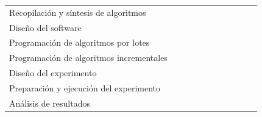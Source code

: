 \documentclass[oneside,openright,titlepage,numbers=noenddot,openany,headinclude,footinclude=true,
cleardoublepage=empty,abstractoff,BCOR=5mm,paper=a4,fontsize=12pt,main=spanish]{scrreprt}
\begin{document}
\begin{table}[H]
{\begin{tabular}{l|c|cccccclll}
Recopilación y síntesis de algoritmos             &                          &                          &                          & \cellcolor[HTML]{34FF34} &                          &                          &                          &                                              &                                              &                                              \\
Diseño del software                               &                          &                          &                          &                          & \cellcolor[HTML]{34FF34} &                          &                          &                                              &                                              &                                              \\
Programación de algoritmos por lotes              &                          &                          &                          &                          & \cellcolor[HTML]{34FF34} & \cellcolor[HTML]{34FF34} & \cellcolor[HTML]{34FF34} &                                              &                                              &                                              \\
Programación de algoritmos incrementales          &                          &                          &                          &                          &                          &                          & \cellcolor[HTML]{34FF34} & \multicolumn{1}{c}{\cellcolor[HTML]{34FF34}} &                                              &                                              \\
Diseño del experimento                            &                          &                          &                          &                          &                          &                          &                          & \multicolumn{1}{c}{\cellcolor[HTML]{34FF34}} & \multicolumn{1}{c}{}                         &                                              \\
Preparación y ejecución del experimento           & \multicolumn{1}{l|}{}    & \multicolumn{1}{l}{}     & \multicolumn{1}{l}{}     & \multicolumn{1}{l}{}     & \multicolumn{1}{l}{}     & \multicolumn{1}{l}{}     & \multicolumn{1}{l}{}     &                                              & \multicolumn{1}{c}{\cellcolor[HTML]{34FF34}} &                                              \\
Análisis de resultados                            & \multicolumn{1}{l|}{}    & \multicolumn{1}{l}{}     & \multicolumn{1}{l}{}     & \multicolumn{1}{l}{}     & \multicolumn{1}{l}{}     & \multicolumn{1}{l}{}     & \multicolumn{1}{l}{}     &                                              & \multicolumn{1}{c}{\cellcolor[HTML]{34FF34}} & \multicolumn{1}{c}{\cellcolor[HTML]{34FF34}} \\

\end{tabular}}
\end{table}
\end{document}

